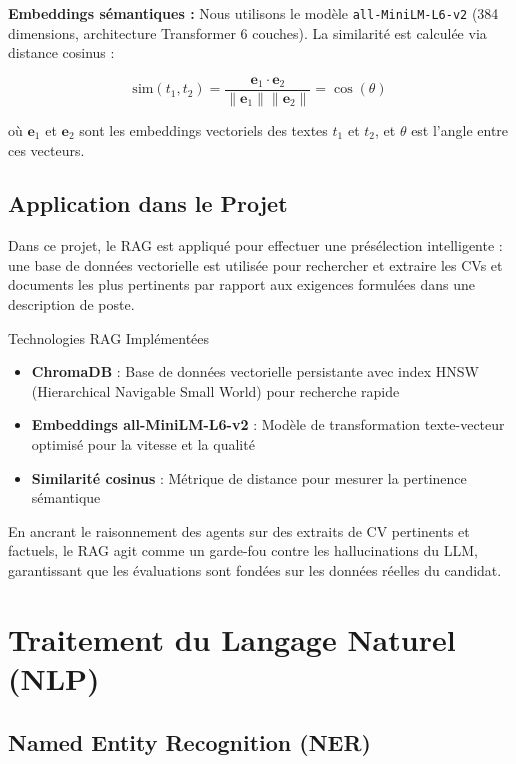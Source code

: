 \documentclass{rapportECL}
\begin{document}
\textbf{Embeddings sémantiques :} Nous utilisons le modèle \texttt{all-MiniLM-L6-v2} (384 dimensions, architecture Transformer 6 couches). La similarité est calculée via distance cosinus :

\begin{equation}
\text{sim}(t_1, t_2) = \frac{\mathbf{e}_1 \cdot \mathbf{e}_2}{\|\mathbf{e}_1\| \|\mathbf{e}_2\|} = \cos(\theta)
\end{equation}

où $\mathbf{e}_1$ et $\mathbf{e}_2$ sont les embeddings vectoriels des textes $t_1$ et $t_2$, et $\theta$ est l'angle entre ces vecteurs.

\subsection{Application dans le Projet}

Dans ce projet, le RAG est appliqué pour effectuer une présélection intelligente : une base de données vectorielle est utilisée pour rechercher et extraire les CVs et documents les plus pertinents par rapport aux exigences formulées dans une description de poste. 

\begin{infobox}{Technologies RAG Implémentées}
\begin{itemize}
    \item \textbf{ChromaDB} : Base de données vectorielle persistante avec index HNSW (Hierarchical Navigable Small World) pour recherche rapide
    \item \textbf{Embeddings all-MiniLM-L6-v2} : Modèle de transformation texte-vecteur optimisé pour la vitesse et la qualité
    \item \textbf{Similarité cosinus} : Métrique de distance pour mesurer la pertinence sémantique
\end{itemize}
\end{infobox}

En ancrant le raisonnement des agents sur des extraits de CV pertinents et factuels, le RAG agit comme un garde-fou contre les hallucinations du LLM, garantissant que les évaluations sont fondées sur les données réelles du candidat.

\section{Traitement du Langage Naturel (NLP)}

\subsection{Named Entity Recognition (NER)}
\end{document}
